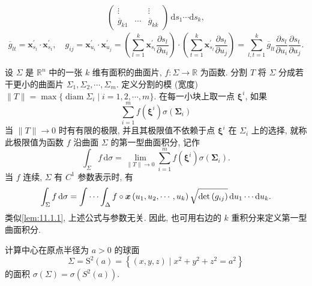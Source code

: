 \begin{definition}
\begin{align*}
{\begin{pmatrix}
      \vdots & & \vdots \\
      \overline{g}_{k 1} & \cdots & \overline{g}_{k k}
    \end{pmatrix}}\,\mathrm{d} s_{1} \cdots \mathrm{d} s_{k},
\end{align*}
\[
  \overline{g}_{l t}=\boldsymbol{x}_{s_{l}}^{\prime} \cdot \boldsymbol{x}_{s_{t}}^{\prime}, \quad g_{i j}=\boldsymbol{x}_{u_{i}}^{\prime} \cdot \boldsymbol{x}_{u_{j}}^{\prime}=\left(\sum_{l=1}^{k} \boldsymbol{x}_{s_{l}}^{\prime} \frac{\partial s_{l}}{\partial u_{i}}\right) \cdot\left(\sum_{t=1}^{k} \boldsymbol{x}_{s_{t}}^{\prime} \frac{\partial s_{t}}{\partial u_{j}}\right)=\sum_{l, t=1}^{k} \overline{g}_{l t} \frac{\partial s_{l}}{\partial u_{i}} \frac{\partial s_{t}}{\partial u_{j}}.
\]
\end{definition}

\begin{definition}\label{def:11.1.5}
设 $\Sigma$ 是 $\mathbb{R}^{n}$ 中的一张 $k$ 维有面积的曲面片, $f: \Sigma \to \mathbb{R}$ 为函数. 分割 $T$ 将 $\Sigma$ 分成若干更小的曲面片 $\Sigma_{1}, \Sigma_{2}, \cdots, \Sigma_{m}$. 定义分割的模 (宽度)\allowbreak $\|T\|=\max \bigl\{\operatorname{diam} \Sigma_{i} \mid\allowbreak i=1,2, \cdots, m\bigr\}$. 在每一小块上取一点 $\boldsymbol{\xi}^{i}$, 如果
\[
  \sum_{i=1}^{m} f\left(\boldsymbol{\xi}^{i}\right) \sigma\left(\boldsymbol{\Sigma}_{i}\right)
\]
当 $\|T\| \to 0$ 时有有限的极限, 并且其极限值不依赖于点 $\boldsymbol{\xi}^{i}$ 在 $\Sigma_{i}$ 上的选择, 就称此极限值为函数 $f$ 沿曲面 $\Sigma$ 的第一型曲面积分, 记作
\[
  \int_{\Sigma} f\,\mathrm{d} \sigma=\lim _{\|T\| \to 0} \sum_{i=1}^{m} f\left(\boldsymbol{\xi}^{i}\right) \sigma\left(\boldsymbol{\Sigma}_{i}\right).
\]
当 $f$ 连续, $\Sigma$ 有 $C^{1}$ 参数表示时, 有
\[
  \int_{\Sigma} f\,\mathrm{d} \sigma=\idotsint_{\Delta} f \circ \boldsymbol{x}\left(u_{1}, u_{2}, \cdots, u_{k}\right) \sqrt{\operatorname{det}\left(g_{i j}\right)}\,\mathrm{d} u_{1} \cdots \mathrm{d} u_{k}.
\]
类似\cref{lem:11.1.1}, 上述公式与参数无关. 因此, 也可用右边的 $k$ 重积分来定义第一型曲面积分.
\end{definition}

\begin{example}\label{ex:11.1.4}
计算中心在原点半径为 $a>0$ 的球面
\[
  \Sigma=\mathrm{S}^{2}(a)=\left\{(x, y, z) \mid x^{2}+y^{2}+z^{2}=a^{2}\right\}
\]
的面积 $\sigma(\Sigma)=\sigma\left(S^{2}(a)\right)$.
\end{example}

